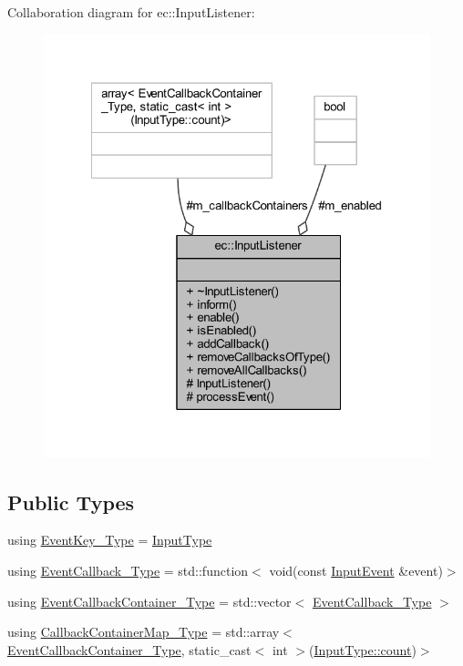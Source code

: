 Collaboration diagram for ec\+:\+:Input\+Listener\+:\nopagebreak
\begin{figure}[H]
\begin{center}
\leavevmode
\includegraphics[width=322pt]{classec_1_1_input_listener__coll__graph}
\end{center}
\end{figure}
\subsection*{Public Types}
\begin{DoxyCompactItemize}
\item 
using \mbox{\hyperlink{classec_1_1_input_listener_af5dfb691564fa8e05fcf7f053e3c532b}{Event\+Key\+\_\+\+Type}} = \mbox{\hyperlink{namespaceec_ae2d697393ea83b34b18ab14eb5dacbca}{Input\+Type}}
\item 
using \mbox{\hyperlink{classec_1_1_input_listener_aa622615b11dfc5cd1dce423fafe27c93}{Event\+Callback\+\_\+\+Type}} = std\+::function$<$ void(const \mbox{\hyperlink{structec_1_1_input_event}{Input\+Event}} \&event)$>$
\item 
using \mbox{\hyperlink{classec_1_1_input_listener_a0d9334fafd46399a39448fe00fad3c2e}{Event\+Callback\+Container\+\_\+\+Type}} = std\+::vector$<$ \mbox{\hyperlink{classec_1_1_input_listener_aa622615b11dfc5cd1dce423fafe27c93}{Event\+Callback\+\_\+\+Type}} $>$
\item 
using \mbox{\hyperlink{classec_1_1_input_listener_abf0825f1f31a1373c5c03e51da123148}{Callback\+Container\+Map\+\_\+\+Type}} = std\+::array$<$ \mbox{\hyperlink{classec_1_1_input_listener_a0d9334fafd46399a39448fe00fad3c2e}{Event\+Callback\+Container\+\_\+\+Type}}, static\+\_\+cast$<$ int $>$(\mbox{\hyperlink{namespaceec_a30e2a743ebdeb02ac68a6cfa50f629c7ae2942a04780e223b215eb8b663cf5353}{Input\+Type\+::count}})$>$
\end{DoxyCompactItemize}
